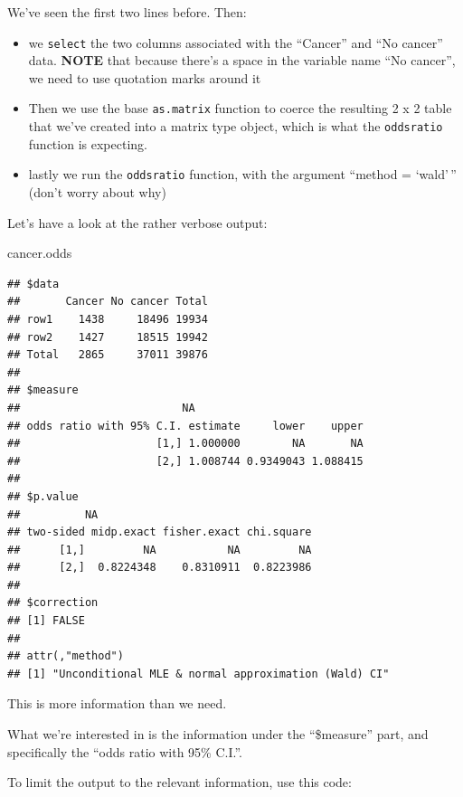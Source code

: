 \documentclass[
]{book}
\newenvironment{Shaded}{\begin{snugshade}}{\end{snugshade}}
\newcommand{\DecValTok}[1]{\textcolor[rgb]{0.00,0.00,0.81}{#1}}
\newcommand{\NormalTok}[1]{#1}
\newcommand{\SpecialCharTok}[1]{\textcolor[rgb]{0.81,0.36,0.00}{\textbf{#1}}}
\providecommand{\tightlist}{%
  \setlength{\itemsep}{0pt}\setlength{\parskip}{0pt}}
\begin{document}
We've seen the first two lines before. Then:

\begin{itemize}
\tightlist
\item
  we \texttt{select} the two columns associated with the ``Cancer'' and ``No cancer'' data. \textbf{NOTE} that because there's a space in the variable name ``No cancer'', we need to use quotation marks around it
\item
  Then we use the base \texttt{as.matrix} function to coerce the resulting 2 x 2 table that we've created into a matrix type object, which is what the \texttt{oddsratio} function is expecting.
\item
  lastly we run the \texttt{oddsratio} function, with the argument ``method = `wald'\,'' (don't worry about why)
\end{itemize}

Let's have a look at the rather verbose output:

\begin{Shaded}
\begin{Highlighting}[]
\NormalTok{cancer.odds}
\end{Highlighting}
\end{Shaded}

\begin{verbatim}
## $data
##       Cancer No cancer Total
## row1    1438     18496 19934
## row2    1427     18515 19942
## Total   2865     37011 39876
## 
## $measure
##                         NA
## odds ratio with 95% C.I. estimate     lower    upper
##                     [1,] 1.000000        NA       NA
##                     [2,] 1.008744 0.9349043 1.088415
## 
## $p.value
##          NA
## two-sided midp.exact fisher.exact chi.square
##      [1,]         NA           NA         NA
##      [2,]  0.8224348    0.8310911  0.8223986
## 
## $correction
## [1] FALSE
## 
## attr(,"method")
## [1] "Unconditional MLE & normal approximation (Wald) CI"
\end{verbatim}

This is more information than we need.

What we're interested in is the information under the ``\$measure'' part, and specifically the ``odds ratio with 95\% C.I.''.

To limit the output to the relevant information, use this code:

\begin{Shaded}
\end{Shaded}
\end{document}
